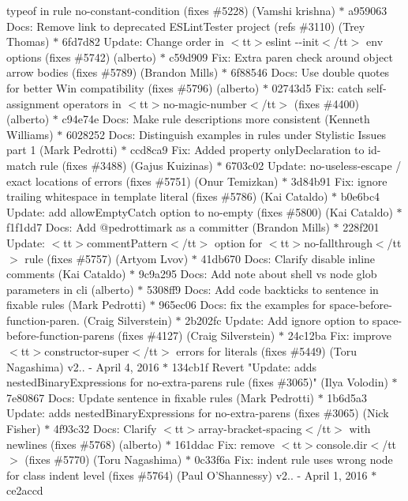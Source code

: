 \begin{DoxyItemize}
\textquotesingle{}typeof\textquotesingle{} in rule \textquotesingle{}no-\/constant-\/condition\textquotesingle{} (fixes \#5228) (\+Vamshi krishna) \texorpdfstring{$\ast$}{*} a959063 Docs\+: Remove link to deprecated ESLint\+Tester project (refs \#3110) (\+Trey Thomas) \texorpdfstring{$\ast$}{*} 6fd7d82 Update\+: Change order in $<$tt$>$eslint -\/-\/init$<$/tt$>$ env options (fixes \#5742) (alberto) \texorpdfstring{$\ast$}{*} c59d909 Fix\+: Extra paren check around object arrow bodies (fixes \#5789) (\+Brandon Mills) \texorpdfstring{$\ast$}{*} 6f88546 Docs\+: Use double quotes for better Win compatibility (fixes \#5796) (alberto) \texorpdfstring{$\ast$}{*} 02743d5 Fix\+: catch self-\/assignment operators in $<$tt$>$no-\/magic-\/number$<$/tt$>$ (fixes \#4400) (alberto) \texorpdfstring{$\ast$}{*} c94e74e Docs\+: Make rule descriptions more consistent (\+Kenneth Williams) \texorpdfstring{$\ast$}{*} 6028252 Docs\+: Distinguish examples in rules under Stylistic Issues part 1 (\+Mark Pedrotti) \texorpdfstring{$\ast$}{*} ccd8ca9 Fix\+: Added property only\+Declaration to id-\/match rule (fixes \#3488) (\+Gajus Kuizinas) \texorpdfstring{$\ast$}{*} 6703c02 Update\+: no-\/useless-\/escape / exact locations of errors (fixes \#5751) (\+Onur Temizkan) \texorpdfstring{$\ast$}{*} 3d84b91 Fix\+: ignore trailing whitespace in template literal (fixes \#5786) (\+Kai Cataldo) \texorpdfstring{$\ast$}{*} b0e6bc4 Update\+: add allow\+Empty\+Catch option to no-\/empty (fixes \#5800) (\+Kai Cataldo) \texorpdfstring{$\ast$}{*} f1f1dd7 Docs\+: Add @pedrottimark as a committer (\+Brandon Mills) \texorpdfstring{$\ast$}{*} 228f201 Update\+: $<$tt$>$comment\+Pattern$<$/tt$>$ option for $<$tt$>$no-\/fallthrough$<$/tt$>$ rule (fixes \#5757) (\+Artyom Lvov) \texorpdfstring{$\ast$}{*} 41db670 Docs\+: Clarify disable inline comments (\+Kai Cataldo) \texorpdfstring{$\ast$}{*} 9c9a295 Docs\+: Add note about shell vs node glob parameters in cli (alberto) \texorpdfstring{$\ast$}{*} 5308ff9 Docs\+: Add code backticks to sentence in fixable rules (\+Mark Pedrotti) \texorpdfstring{$\ast$}{*} 965ec06 Docs\+: fix the examples for space-\/before-\/function-\/paren. (\+Craig Silverstein) \texorpdfstring{$\ast$}{*} 2b202fc Update\+: Add ignore option to space-\/before-\/function-\/parens (fixes \#4127) (\+Craig Silverstein) \texorpdfstring{$\ast$}{*} 24c12ba Fix\+: improve $<$tt$>$constructor-\/super$<$/tt$>$ errors for literals (fixes \#5449) (\+Toru Nagashima)  v2.. -\/ April 4, 2016  \texorpdfstring{$\ast$}{*} 134cb1f Revert "{}Update\+: adds nested\+Binary\+Expressions for no-\/extra-\/parens rule (fixes \#3065)"{} (\+Ilya Volodin) \texorpdfstring{$\ast$}{*} 7e80867 Docs\+: Update sentence in fixable rules (\+Mark Pedrotti) \texorpdfstring{$\ast$}{*} 1b6d5a3 Update\+: adds nested\+Binary\+Expressions for no-\/extra-\/parens (fixes \#3065) (\+Nick Fisher) \texorpdfstring{$\ast$}{*} 4f93c32 Docs\+: Clarify $<$tt$>$array-\/bracket-\/spacing$<$/tt$>$ with newlines (fixes \#5768) (alberto) \texorpdfstring{$\ast$}{*} 161ddac Fix\+: remove $<$tt$>$console.\+dir$<$/tt$>$ (fixes \#5770) (\+Toru Nagashima) \texorpdfstring{$\ast$}{*} 0c33f6a Fix\+: indent rule uses wrong node for class indent level (fixes \#5764) (\+Paul O’\+Shannessy)  v2.. -\/ April 1, 2016  \texorpdfstring{$\ast$}{*} ce2accd 
\end{DoxyItemize}

